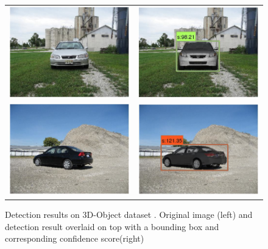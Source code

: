 \documentclass[10pt,twocolumn,letterpaper]{article}
\begin{document}
\begin{figure}[h]
    \begin{center}
    \setlength\tabcolsep{0pt}
\begin{tabular}{cc}
  \includegraphics[width=0.45\linewidth]{car_3dobject/7.png} &   
  \includegraphics[width=0.45\linewidth]{car_3dobject/8.png}\\ [-15pt]
  \includegraphics[width=0.45\linewidth]{car_3dobject/11.png} &   
  \includegraphics[width=0.45\linewidth]{car_3dobject/12.png}\\ [-5pt]
\end{tabular}
\end{center}
\caption{Detection results on 3D-Object dataset \cite{Savarese07}. Original image (left) and detection result overlaid on top with a bounding box and corresponding confidence score(right)}
  \label{fig:3dobject}
\end{figure}
\end{document}
